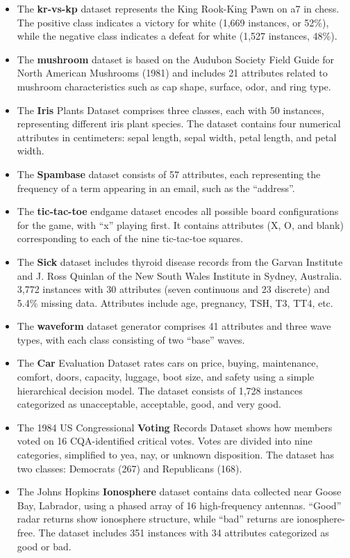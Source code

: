 \begin{itemize}
    \item The \textbf{kr-vs-kp} dataset represents the King Rook-King Pawn on a7 in chess. The positive class indicates a victory for white (1,669 instances, or 52\%), while the negative class indicates a defeat for white (1,527 instances, 48\%).
    \item The \textbf{mushroom} dataset is based on the Audubon Society Field Guide for North American Mushrooms (1981) and includes 21 attributes related to mushroom characteristics such as cap shape, surface, odor, and ring type.
    \item The \textbf{Iris} Plants Dataset comprises three classes, each with 50 instances, representing different iris plant species. The dataset contains four numerical attributes in centimeters: sepal length, sepal width, petal length, and petal width.
    \item The \textbf{Spambase} dataset consists of 57 attributes, each representing the frequency of a term appearing in an email, such as the ``address''.
    \item The \textbf{tic-tac-toe} endgame dataset encodes all possible board configurations for the game, with ``x'' playing first. It contains attributes (X, O, and blank) corresponding to each of the nine tic-tac-toe squares.
    \item The \textbf{Sick} dataset includes thyroid disease records from the Garvan Institute and J. Ross Quinlan of the New South Wales Institute in Sydney, Australia. 3,772 instances with 30 attributes (seven continuous and 23 discrete) and 5.4\% missing data. Attributes include age, pregnancy, TSH, T3, TT4, etc.
    \item The \textbf{waveform} dataset generator comprises 41 attributes and three wave types, with each class consisting of two ``base'' waves.
    \item The \textbf{Car} Evaluation Dataset rates cars on price, buying, maintenance, comfort, doors, capacity, luggage, boot size, and safety using a simple hierarchical decision model. The dataset consists of 1,728 instances categorized as unacceptable, acceptable, good, and very good.
    \item The 1984 US Congressional \textbf{Voting} Records Dataset shows how members voted on 16 CQA-identified critical votes. Votes are divided into nine categories, simplified to yea, nay, or unknown disposition. The dataset has two classes: Democrats (267) and Republicans (168).
    \item The Johns Hopkins \textbf{Ionosphere} dataset contains data collected near Goose Bay, Labrador, using a phased array of 16 high-frequency antennas. ``Good'' radar returns show ionosphere structure, while ``bad'' returns are ionosphere-free. The dataset includes 351 instances with 34 attributes categorized as good or bad.
\end{itemize}

